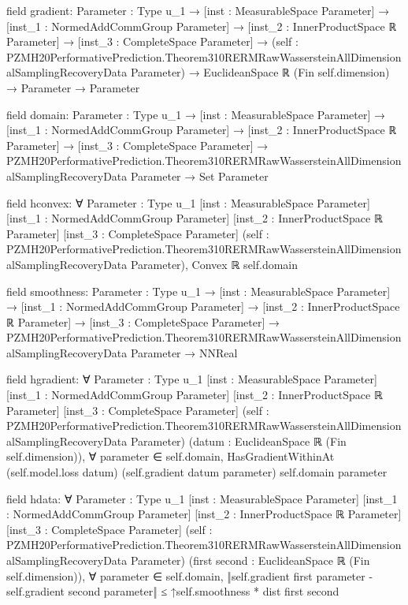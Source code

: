 \documentclass[10pt]{article}
\begin{document}
\begin{ReviewVerbatim}
field gradient:
{Parameter : Type u_1} →
  [inst : MeasurableSpace Parameter] →
    [inst_1 : NormedAddCommGroup Parameter] →
      [inst_2 : InnerProductSpace ℝ Parameter] →
        [inst_3 : CompleteSpace Parameter] →
          (self :
              PZMH20PerformativePrediction.Theorem310RERMRawWassersteinAllDimensionalSamplingRecoveryData Parameter) →
            EuclideanSpace ℝ (Fin self.dimension) → Parameter → Parameter

field domain:
{Parameter : Type u_1} →
  [inst : MeasurableSpace Parameter] →
    [inst_1 : NormedAddCommGroup Parameter] →
      [inst_2 : InnerProductSpace ℝ Parameter] →
        [inst_3 : CompleteSpace Parameter] →
          PZMH20PerformativePrediction.Theorem310RERMRawWassersteinAllDimensionalSamplingRecoveryData Parameter →
            Set Parameter

field hconvex:
∀ {Parameter : Type u_1} [inst : MeasurableSpace Parameter] [inst_1 : NormedAddCommGroup Parameter]
  [inst_2 : InnerProductSpace ℝ Parameter] [inst_3 : CompleteSpace Parameter]
  (self : PZMH20PerformativePrediction.Theorem310RERMRawWassersteinAllDimensionalSamplingRecoveryData Parameter),
  Convex ℝ self.domain

field smoothness:
{Parameter : Type u_1} →
  [inst : MeasurableSpace Parameter] →
    [inst_1 : NormedAddCommGroup Parameter] →
      [inst_2 : InnerProductSpace ℝ Parameter] →
        [inst_3 : CompleteSpace Parameter] →
          PZMH20PerformativePrediction.Theorem310RERMRawWassersteinAllDimensionalSamplingRecoveryData Parameter → NNReal

field hgradient:
∀ {Parameter : Type u_1} [inst : MeasurableSpace Parameter] [inst_1 : NormedAddCommGroup Parameter]
  [inst_2 : InnerProductSpace ℝ Parameter] [inst_3 : CompleteSpace Parameter]
  (self : PZMH20PerformativePrediction.Theorem310RERMRawWassersteinAllDimensionalSamplingRecoveryData Parameter)
  (datum : EuclideanSpace ℝ (Fin self.dimension)),
  ∀ parameter ∈ self.domain,
    HasGradientWithinAt (self.model.loss datum) (self.gradient datum parameter) self.domain parameter

field hdata:
∀ {Parameter : Type u_1} [inst : MeasurableSpace Parameter] [inst_1 : NormedAddCommGroup Parameter]
  [inst_2 : InnerProductSpace ℝ Parameter] [inst_3 : CompleteSpace Parameter]
  (self : PZMH20PerformativePrediction.Theorem310RERMRawWassersteinAllDimensionalSamplingRecoveryData Parameter)
  (first second : EuclideanSpace ℝ (Fin self.dimension)),
  ∀ parameter ∈ self.domain,
    ‖self.gradient first parameter - self.gradient second parameter‖ ≤ ↑self.smoothness * dist first second


\end{ReviewVerbatim}
\end{document}
